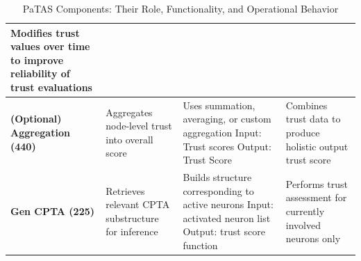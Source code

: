 \begin{table}[htbp]
\begin{tabularx}{\textwidth}{|p{3.5cm}|X|X|X|}
Modifies trust values over time to improve reliability of trust evaluations \\
\hline
\textbf{(Optional) Aggregation (440)} & 
Aggregates node-level trust into overall score & 
Uses summation, averaging, or custom aggregation \newline Input: Trust scores \newline Output: Trust Score & 
Combines trust data to produce holistic output trust score \\
\hline
\textbf{Gen CPTA (225)} & 
Retrieves relevant CPTA substructure for inference & 
Builds structure corresponding to active neurons \newline Input: activated neuron list \newline Output: trust score function & 
Performs trust assessment for currently involved neurons only \\

\hline
\end{tabularx}
\caption{PaTAS Components: Their Role, Functionality, and Operational Behavior}
\label{tab:ptas_table}
\end{table}


